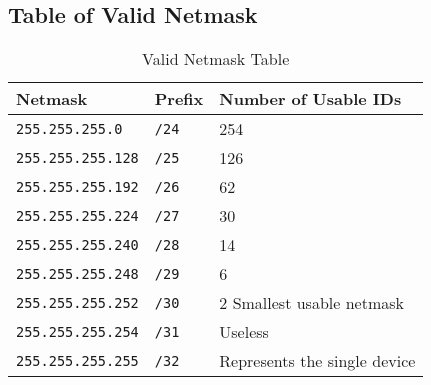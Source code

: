   \subsection{Table of Valid Netmask}

  \begin{table}[h]
    \centering
    \begin{tabular}{lll}
      \hline
      Netmask & Prefix & Number of Usable IDs \\
      \hline
      \texttt{255.255.255.0} & \texttt{/24} & 254 \\
      \texttt{255.255.255.128} & \texttt{/25} & 126 \\
      \texttt{255.255.255.192} & \texttt{/26} & 62 \\
      \texttt{255.255.255.224} & \texttt{/27} & 30 \\
      \texttt{255.255.255.240} & \texttt{/28} & 14 \\
      \texttt{255.255.255.248} & \texttt{/29} & 6 \\
      \texttt{255.255.255.252} & \texttt{/30} & 2 \colorbox{green!20}{Smallest usable netmask} \\
      \texttt{255.255.255.254} & \texttt{/31} & \colorbox{red!20}{Useless} \\
      \texttt{255.255.255.255} & \texttt{/32} & \colorbox{yellow!20}{Represents the single device} \\
      \hline
    \end{tabular}
    \caption{Valid Netmask Table}
  \end{table}



